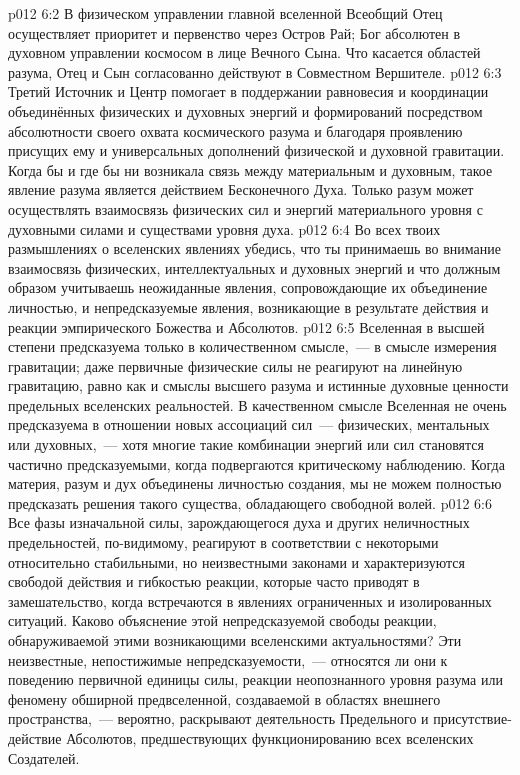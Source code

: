 \vs p012 6:2 В физическом управлении главной вселенной Всеобщий Отец осуществляет приоритет и первенство через Остров Рай; Бог абсолютен в духовном управлении космосом в лице Вечного Сына. Что касается областей разума, Отец и Сын согласованно действуют в Совместном Вершителе.
\vs p012 6:3 Третий Источник и Центр помогает в поддержании равновесия и координации объединённых физических и духовных энергий и формирований посредством абсолютности своего охвата космического разума и благодаря проявлению присущих ему и универсальных дополнений физической и духовной гравитации. Когда бы и где бы ни возникала связь между материальным и духовным, такое явление разума является действием Бесконечного Духа. Только разум может осуществлять взаимосвязь физических сил и энергий материального уровня с духовными силами и существами уровня духа.
\vs p012 6:4 Во всех твоих размышлениях о вселенских явлениях убедись, что ты принимаешь во внимание взаимосвязь физических, интеллектуальных и духовных энергий и что должным образом учитываешь неожиданные явления, сопровождающие их объединение личностью, и непредсказуемые явления, возникающие в результате действия и реакции эмпирического Божества и Абсолютов.
\vs p012 6:5 Вселенная в высшей степени предсказуема только в количественном смысле,~--- в смысле измерения гравитации; даже первичные физические силы не реагируют на линейную гравитацию, равно как и смыслы высшего разума и истинные духовные ценности предельных вселенских реальностей. В качественном смысле Вселенная не очень предсказуема в отношении новых ассоциаций сил~--- физических, ментальных или духовных,~--- хотя многие такие комбинации энергий или сил становятся частично предсказуемыми, когда подвергаются критическому наблюдению. Когда материя, разум и дух объединены личностью создания, мы не можем полностью предсказать решения такого существа, обладающего свободной волей.
\vs p012 6:6 \pc Все фазы изначальной силы, зарождающегося духа и других неличностных предельностей, по\hyp{}видимому, реагируют в соответствии с некоторыми относительно стабильными, но неизвестными законами и характеризуются свободой действия и гибкостью реакции, которые часто приводят в замешательство, когда встречаются в явлениях ограниченных и изолированных ситуаций. Каково объяснение этой непредсказуемой свободы реакции, обнаруживаемой этими возникающими вселенскими актуальностями? Эти неизвестные, непостижимые непредсказуемости,~--- относятся ли они к поведению первичной единицы силы, реакции неопознанного уровня разума или феномену обширной предвселенной, создаваемой в областях внешнего пространства,~--- вероятно, раскрывают деятельность Предельного и присутствие\hyp{}действие Абсолютов, предшествующих функционированию всех вселенских Создателей.
